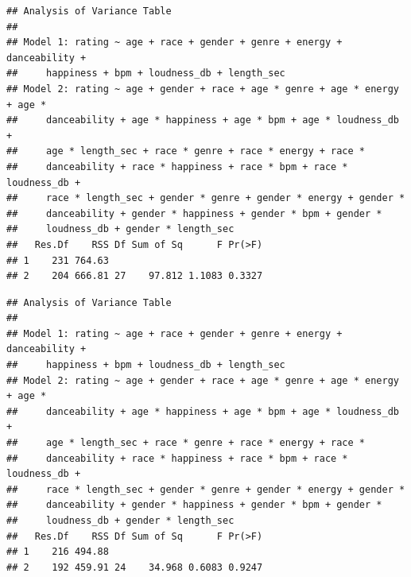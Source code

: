 \documentclass[
]{article}
\newenvironment{Shaded}{\begin{snugshade}}{\end{snugshade}}
\newcommand{\FunctionTok}[1]{\textcolor[rgb]{0.13,0.29,0.53}{\textbf{#1}}}
\newcommand{\NormalTok}[1]{#1}
\newcommand{\SpecialCharTok}[1]{\textcolor[rgb]{0.81,0.36,0.00}{\textbf{#1}}}
\newcommand{\StringTok}[1]{\textcolor[rgb]{0.31,0.60,0.02}{#1}}
\begin{document}
\begin{verbatim}
## Analysis of Variance Table
## 
## Model 1: rating ~ age + race + gender + genre + energy + danceability + 
##     happiness + bpm + loudness_db + length_sec
## Model 2: rating ~ age + gender + race + age * genre + age * energy + age * 
##     danceability + age * happiness + age * bpm + age * loudness_db + 
##     age * length_sec + race * genre + race * energy + race * 
##     danceability + race * happiness + race * bpm + race * loudness_db + 
##     race * length_sec + gender * genre + gender * energy + gender * 
##     danceability + gender * happiness + gender * bpm + gender * 
##     loudness_db + gender * length_sec
##   Res.Df    RSS Df Sum of Sq      F Pr(>F)
## 1    231 764.63                           
## 2    204 666.81 27    97.812 1.1083 0.3327
\end{verbatim}

\begin{Shaded}
\end{Shaded}

\begin{verbatim}
## Analysis of Variance Table
## 
## Model 1: rating ~ age + race + gender + genre + energy + danceability + 
##     happiness + bpm + loudness_db + length_sec
## Model 2: rating ~ age + gender + race + age * genre + age * energy + age * 
##     danceability + age * happiness + age * bpm + age * loudness_db + 
##     age * length_sec + race * genre + race * energy + race * 
##     danceability + race * happiness + race * bpm + race * loudness_db + 
##     race * length_sec + gender * genre + gender * energy + gender * 
##     danceability + gender * happiness + gender * bpm + gender * 
##     loudness_db + gender * length_sec
##   Res.Df    RSS Df Sum of Sq      F Pr(>F)
## 1    216 494.88                           
## 2    192 459.91 24    34.968 0.6083 0.9247
\end{verbatim}

\begin{Shaded}
\end{Shaded}
\end{document}
